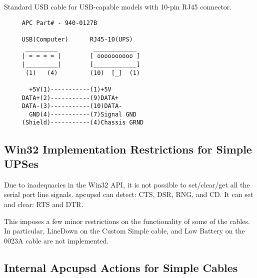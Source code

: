 Standard USB cable for USB-capable models with 10-pin RJ45 connector.

\footnotesize
\begin{verbatim}
     APC Part# - 940-0127B

     USB(Computer)      RJ45-10(UPS)
      _________          ____________
     | = = = = |        [ oooooooooo ]
     |_________|        [____________]
      (1)   (4)         (10)  [_]  (1)
     
       +5V(1)-----------(1)+5V
     DATA+(2)-----------(9)DATA+
     DATA-(3)-----------(10)DATA-
       GND(4)-----------(7)Signal GND
     (Shield)-----------(4)Chassis GRND
\end{verbatim}
\normalsize

\label{Win32-Implementation-Restrictions-for-Simple-UPSes}

\subsection*{Win32 Implementation Restrictions for Simple UPSes}

\label{index-Cables-213}
\label{index-Windows-214}
Due to inadequacies in the Win32 API, it is not possible to set/clear/get all
the serial port line signals. apcupsd can detect: CTS, DSR, RNG, and CD. It
can set and clear: RTS and DTR.  

This imposes a few minor restrictions on the functionality of some of the
cables. In particular, LineDown on the Custom Simple cable, and Low Battery on
the 0023A cable are not implemented. 

\label{Internal-Apcupsd-Actions-for-Simple-Cables}

\subsection*{Internal Apcupsd Actions for Simple Cables}

\label{index-Cables-215}

